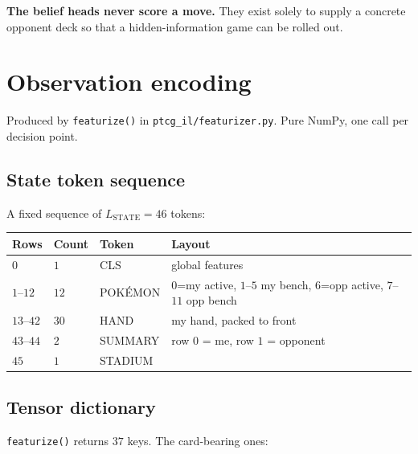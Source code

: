 \documentclass[11pt,a4paper]{article}
\newcommand{\code}[1]{\texttt{\small #1}}
\newcommand{\file}[1]{\texttt{\small #1}}
\begin{document}
\noindent
\textbf{The belief heads never score a move.} They exist solely to supply a
concrete opponent deck so that a hidden-information game can be rolled out.

\section{Observation encoding}
\label{sec:obs}

Produced by \code{featurize()} in \file{ptcg\_il/featurizer.py}. Pure NumPy,
one call per decision point.

\subsection{State token sequence}

A fixed sequence of $L_{\text{STATE}} = 46$ tokens:

\begin{center}
\begin{tabular}{@{}llll@{}}
\toprule
\textbf{Rows} & \textbf{Count} & \textbf{Token} & \textbf{Layout} \\
\midrule
$0$        & $1$  & CLS      & global features \\
$1$--$12$  & $12$ & POK\'EMON & $0$=my active, $1$--$5$ my bench, $6$=opp active, $7$--$11$ opp bench \\
$13$--$42$ & $30$ & HAND     & my hand, packed to front \\
$43$--$44$ & $2$  & SUMMARY  & row $0$ = me, row $1$ = opponent \\
$45$       & $1$  & STADIUM  & \\
\bottomrule
\end{tabular}
\end{center}

\subsection{Tensor dictionary}

\code{featurize()} returns $37$ keys. The card-bearing ones:
\end{document}
